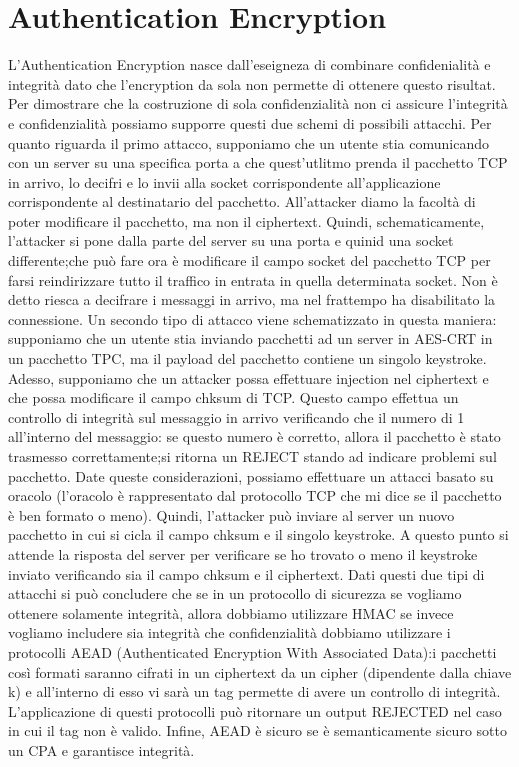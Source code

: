 \documentclass{article}
\begin{document}
\section{Authentication Encryption}
L'Authentication Encryption nasce dall'eseigneza di combinare confidenialità e integrità dato che l'encryption da sola non permette di ottenere questo risultat\@.
Per dimostrare che la costruzione di sola confidenzialità non ci assicure l'integrità e confidenzialità possiamo supporre questi due schemi di possibili attacchi\@.
Per quanto riguarda il primo attacco, supponiamo che un utente stia comunicando con un server su una specifica porta a che quest'utlitmo prenda il pacchetto TCP in arrivo, lo decifri e lo invii alla socket corrispondente all'applicazione corrispondente al destinatario del pacchetto\@. All'attacker diamo la facoltà di poter modificare il pacchetto, ma non il ciphertext\@. Quindi, schematicamente, l'attacker si pone dalla parte del server su una porta e quinid una socket differente;\@quello che può fare ora è modificare il campo socket del pacchetto TCP per farsi reindirizzare tutto il traffico in entrata in quella determinata socket\@. Non è detto riesca a decifrare i messaggi in arrivo, ma nel frattempo ha disabilitato la connessione\@.\newline
Un secondo tipo di attacco viene schematizzato in questa maniera: supponiamo che un utente stia inviando pacchetti ad un server in AES-CRT in un pacchetto TPC, ma il payload del pacchetto contiene un singolo keystroke\@. Adesso, supponiamo che un attacker possa effettuare injection nel ciphertext e che possa modificare il campo chksum di TCP\@. Questo campo effettua un controllo di integrità sul messaggio in arrivo verificando che il numero di 1 all'interno del messaggio: se questo numero è corretto, allora il pacchetto è stato trasmesso correttamente;\@altrminenti si ritorna un REJECT stando ad indicare problemi sul pacchetto\@. Date queste considerazioni, possiamo effettuare un attacci basato su oracolo (l'oracolo è rappresentato dal protocollo TCP che mi dice se il pacchetto è ben formato o meno)\@.\newline
Quindi, l'attacker può inviare al server un nuovo pacchetto in cui si cicla il campo chksum e il singolo keystroke\@. A questo punto si attende la risposta del server per verificare se ho trovato o meno il keystroke inviato verificando sia il campo chksum e il ciphertext\@.\newline
Dati questi due tipi di attacchi si può concludere che se in un protocollo di sicurezza se vogliamo ottenere solamente integrità, allora dobbiamo utilizzare HMAC se invece vogliamo includere sia integrità che confidenzialità dobbiamo utilizzare i protocolli AEAD (Authenticated Encryption With Associated Data):\@ i pacchetti così formati saranno cifrati in un ciphertext da un cipher (dipendente dalla chiave k) e all'interno di esso vi sarà un tag permette di avere un controllo di integrità\@. L'applicazione di questi protocolli può ritornare un output REJECTED nel caso in cui il tag non è valido\@. Infine, AEAD è sicuro se è semanticamente sicuro sotto un CPA e garantisce integrità\@.
\end{document}
